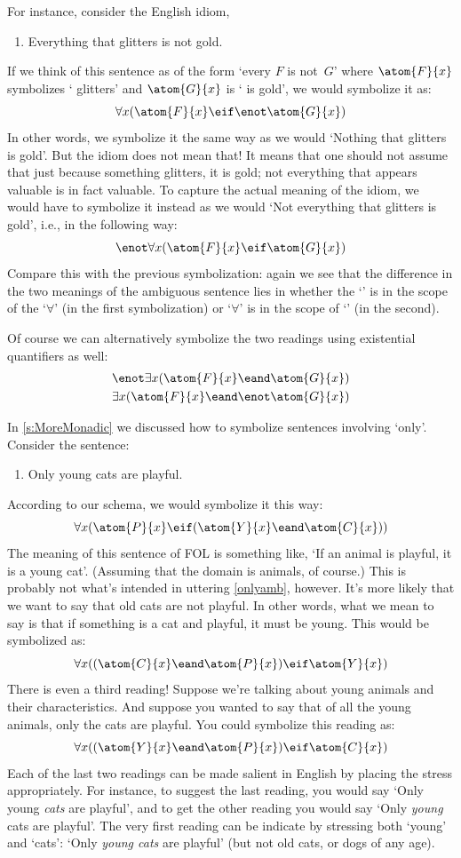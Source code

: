 For instance, consider the English idiom,
\begin{enumerate}
	\item\label{glitters}
	Everything that glitters is not gold.
\end{enumerate}
If we think of this sentence as of the form `every $F$ is not~$G$' where $\atom{F}{x}$ symbolizes ` glitters' and $\atom{G}{x}$ is ` is gold', we would symbolize it as:
\[\forall x(\atom{F}{x} \eif \enot \atom{G}{x})\]
In other words, we symbolize it the same way as we would `Nothing that glitters is gold'. But the idiom does not mean that! It means that one should not assume that just because something glitters, it is gold; not everything that appears valuable is in fact valuable.  To capture the actual meaning of the idiom, we would have to symbolize it instead as we would `Not everything that glitters is gold', i.e., in the following way:
\[\enot\forall x(\atom{F}{x} \eif \atom{G}{x})\]
Compare this with the previous symbolization: again we see that the difference in the two meanings of the ambiguous sentence lies in whether the `\enot' is in the scope of the `$\forall$' (in the first symbolization) or `$\forall$' is in the scope of `\enot' (in the second).

Of course we can alternatively symbolize the two readings using existential quantifiers as well:
\begin{align*}
	& \enot\exists x(\atom{F}{x} \eand \atom{G}{x}) \\
	& \exists x(\atom{F}{x} \eand \enot \atom{G}{x})
\end{align*}

In \cref{s:MoreMonadic} we discussed how to symbolize sentences involving `only'. Consider the sentence:
\begin{enumerate}
	\item\label{onlyamb} Only young cats are playful.
\end{enumerate} 
According to our schema, we would symbolize it this way:
\[
	\forall x(\atom{P}{x} \eif (\atom{Y}{x} \eand \atom{C}{x}))
\]
The meaning of this sentence of FOL is something like, `If an animal is playful, it is a young cat'. (Assuming that the domain is animals, of course.) This is probably not what's intended in uttering \cref*{onlyamb}, however. It's more likely that we want to say that old cats are not playful. In other words, what we mean to say is that if something is a cat and playful, it must be young. This would be symbolized as:
\[
	\forall x((\atom{C}{x} \eand \atom{P}{x}) \eif \atom{Y}{x})
\]
There is even a third reading! Suppose we're talking about young animals and their characteristics. And suppose you wanted to say that of all the young animals, only the cats are playful. You could symbolize this reading as:
\[
	\forall x((\atom{Y}{x} \eand \atom{P}{x}) \eif \atom{C}{x})
\]
Each of the last two readings can be made salient in English by placing the stress appropriately. For instance, to suggest the last reading, you would say `Only young \emph{cats} are playful', and to get the other reading you would say `Only \emph{young} cats are playful'.  The very first reading can be indicate by stressing both `young' and `cats': `Only \emph{young cats} are playful' (but not old cats, or dogs of any age).

